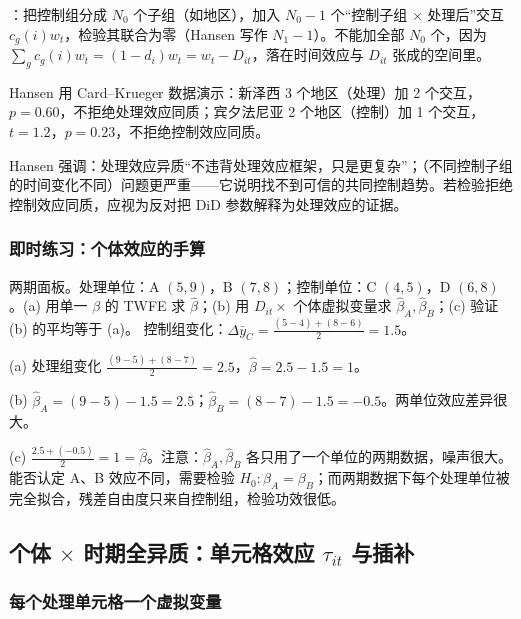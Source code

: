 ：把控制组分成 $N_0$ 个子组（如地区），加入 $N_0-1$ 个“控制子组 $\times$ 处理后”交互 $c_g(i)w_t$，检验其联合为零（Hansen 写作 $N_1-1$）。不能加全部 $N_0$ 个，因为 $\sum_g c_g(i)w_t=(1-d_i)w_t=w_t-D_{it}$，落在时间效应与 $D_{it}$ 张成的空间里。

Hansen 用 Card--Krueger 数据演示：新泽西 3 个地区（处理）加 2 个交互，$p=0.60$，不拒绝处理效应同质；宾夕法尼亚 2 个地区（控制）加 1 个交互，$t=1.2$，$p=0.23$，不拒绝控制效应同质。

\begin{note}[两种异质的严重程度不同]
Hansen 强调：处理效应异质“不违背处理效应框架，只是更复杂”；（不同控制子组的时间变化不同）问题更严重——它说明找不到可信的共同控制趋势。若检验拒绝控制效应同质，应视为反对把 DiD 参数解释为处理效应的证据。
\end{note}

\subsubsection{即时练习：个体效应的手算}

\begin{prac}[个体效应的手算]\label{pr:U15b-indiv}
两期面板。处理单位：A $(5,9)$，B $(7,8)$；控制单位：C $(4,5)$，D $(6,8)$。(a) 用单一 $\beta$ 的 TWFE 求 $\hat\beta$；(b) 用 $D_{it}\times$ 个体虚拟变量求 $\hat\beta_A,\hat\beta_B$；(c) 验证 (b) 的平均等于 (a)。
\answer 控制组变化：$\Delta\bar y_C=\frac{(5-4)+(8-6)}{2}=1.5$。

(a) 处理组变化 $\frac{(9-5)+(8-7)}{2}=2.5$，$\hat\beta=2.5-1.5=1$。

(b) $\hat\beta_A=(9-5)-1.5=2.5$；$\hat\beta_B=(8-7)-1.5=-0.5$。两单位效应差异很大。

(c) $\frac{2.5+(-0.5)}{2}=1=\hat\beta$。注意：$\hat\beta_A,\hat\beta_B$ 各只用了一个单位的两期数据，噪声很大。能否认定 A、B 效应不同，需要检验 $H_0:\beta_A=\beta_B$；而两期数据下每个处理单位被完全拟合，残差自由度只来自控制组，检验功效很低。
\end{prac}

\subsection{个体 \texorpdfstring{$\times$}{x} 时期全异质：单元格效应 \texorpdfstring{$\tau_{it}$}{tau\_it} 与插补}

\subsubsection{每个处理单元格一个虚拟变量}

